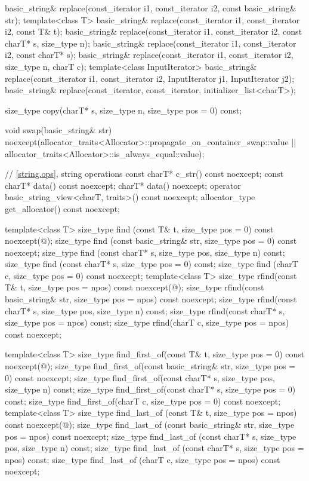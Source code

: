 \begin{codeblock}
{{    basic_string& replace(const_iterator i1, const_iterator i2, const basic_string& str);
    template<class T>
      basic_string& replace(const_iterator i1, const_iterator i2, const T& t);
    basic_string& replace(const_iterator i1, const_iterator i2, const charT* s, size_type n);
    basic_string& replace(const_iterator i1, const_iterator i2, const charT* s);
    basic_string& replace(const_iterator i1, const_iterator i2, size_type n, charT c);
    template<class InputIterator>
      basic_string& replace(const_iterator i1, const_iterator i2,
                            InputIterator j1, InputIterator j2);
    basic_string& replace(const_iterator, const_iterator, initializer_list<charT>);

    size_type copy(charT* s, size_type n, size_type pos = 0) const;

    void swap(basic_string& str)
      noexcept(allocator_traits<Allocator>::propagate_on_container_swap::value ||
               allocator_traits<Allocator>::is_always_equal::value);

    // \ref{string.ops}, string operations
    const charT* c_str() const noexcept;
    const charT* data() const noexcept;
    charT* data() noexcept;
    operator basic_string_view<charT, traits>() const noexcept;
    allocator_type get_allocator() const noexcept;

    template<class T>
      size_type find (const T& t, size_type pos = 0) const noexcept(@\seebelow@);
    size_type find (const basic_string& str, size_type pos = 0) const noexcept;
    size_type find (const charT* s, size_type pos, size_type n) const;
    size_type find (const charT* s, size_type pos = 0) const;
    size_type find (charT c, size_type pos = 0) const noexcept;
    template<class T>
      size_type rfind(const T& t, size_type pos = npos) const noexcept(@\seebelow@);
    size_type rfind(const basic_string& str, size_type pos = npos) const noexcept;
    size_type rfind(const charT* s, size_type pos, size_type n) const;
    size_type rfind(const charT* s, size_type pos = npos) const;
    size_type rfind(charT c, size_type pos = npos) const noexcept;

    template<class T>
      size_type find_first_of(const T& t, size_type pos = 0) const noexcept(@\seebelow@);
    size_type find_first_of(const basic_string& str, size_type pos = 0) const noexcept;
    size_type find_first_of(const charT* s, size_type pos, size_type n) const;
    size_type find_first_of(const charT* s, size_type pos = 0) const;
    size_type find_first_of(charT c, size_type pos = 0) const noexcept;
    template<class T>
      size_type find_last_of (const T& t, size_type pos = npos) const noexcept(@\seebelow@);
    size_type find_last_of (const basic_string& str, size_type pos = npos) const noexcept;
    size_type find_last_of (const charT* s, size_type pos, size_type n) const;
    size_type find_last_of (const charT* s, size_type pos = npos) const;
    size_type find_last_of (charT c, size_type pos = npos) const noexcept;

}}
\end{codeblock}
